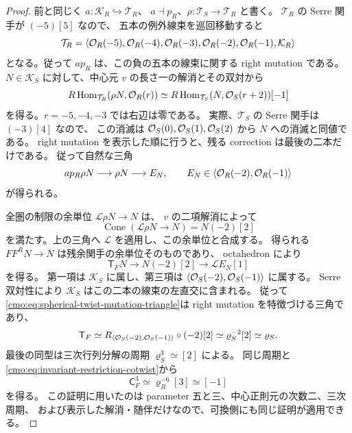\begin{proof}
前と同じく $a:\mathcal K_R\hookrightarrow\mathcal T_R$、
$a\dashv p_R$、$\rho:\mathcal T_S\to\mathcal T_R$ と書く。
$\mathcal T_R$ の Serre 関手が $(-5)[5]$ なので、
五本の例外線束を巡回移動すると
\[
 \mathcal T_R=
 \langle\mathcal O_R(-5),\mathcal O_R(-4),\mathcal O_R(-3),
                  \mathcal O_R(-2),\mathcal O_R(-1),\mathcal K_R\rangle
\]
となる。従って $a p_R$ は、この負の五本の線束に関する right mutation である。
$N\in\mathcal K_S$ に対して、中心元 $v$ の長さ一の解消とその双対から
\begin{equation}
\label{cmo:eq:spherical-twist-line-vanishing}
 R\operatorname{Hom}_{\mathcal T_R}(\rho N,\mathcal O_R(r))
 \simeq
 R\operatorname{Hom}_{\mathcal T_S}(N,\mathcal O_S(r+2))[-1]
\end{equation}
を得る。$r=-5,-4,-3$ では右辺は零である。
実際、$\mathcal T_S$ の Serre 関手は $(-3)[4]$ なので、
この消滅は $\mathcal O_S(0),\mathcal O_S(1),\mathcal O_S(2)$ から $N$ への消滅と同値である。
right mutation を表示した順に行うと、残る correction は最後の二本だけである。
従って自然な三角
\[
 a p_R\rho N\longrightarrow\rho N\longrightarrow E_N,
 \qquad E_N\in\langle\mathcal O_R(-2),\mathcal O_R(-1)\rangle
\]
が得られる。

全圏の制限の余単位 $\mathcal L\rho N\to N$ は、
$v$ の二項解消によって
\[
 \operatorname{Cone}(\mathcal L\rho N\to N)=N(-2)[2]
\]
を満たす。上の三角へ $\mathcal L$ を適用し、この余単位と合成する。
得られる $F F^R N\to N$ は残余関手の余単位そのものであり、
octahedron により
\begin{equation}
\label{cmo:eq:spherical-twist-mutation-triangle}
 \mathsf T_F N\longrightarrow N(-2)[2]
                  \longrightarrow\mathcal L E_N[1]
\end{equation}
を得る。
第一項は $\mathcal K_S$ に属し、第三項は
$\langle\mathcal O_S(-2),\mathcal O_S(-1)\rangle$ に属する。
Serre 双対性により $\mathcal K_S$ はこの二本の線束の左直交に含まれる。
従って\eqref{cmo:eq:spherical-twist-mutation-triangle}は
right mutation を特徴づける三角であり、
\[
 \mathsf T_F\simeq
 R_{\langle\mathcal O_S(-2),\mathcal O_S(-1)\rangle}\circ(-2)[2]
 \simeq\varrho_S^{-2}[2]\simeq\varrho_S.
\]
最後の同型は三次行列分解の周期 $\varrho_S^3\simeq[2]$ による。
同じ周期と\eqref{cmo:eq:invariant-restriction-cotwist}から
\[
 \mathsf C_F^3\simeq\varrho_R^{-6}[3]\simeq[-1]
\]
を得る。
この証明に用いたのは parameter 五と三、中心正則元の次数二、三次周期、
および表示した解消・随伴だけなので、可換側にも同じ証明が適用できる。
\end{proof}

